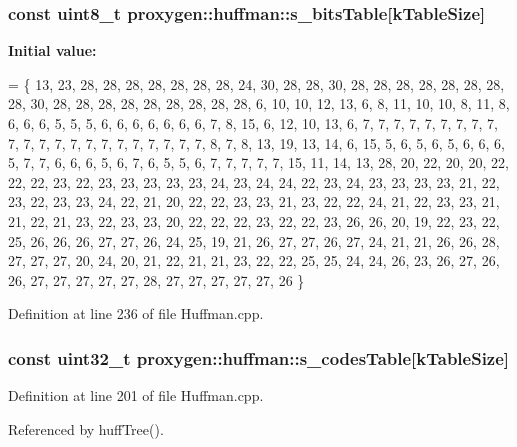 \subsubsection[{s\+\_\+bits\+Table}]{\setlength{\rightskip}{0pt plus 5cm}const uint8\+\_\+t proxygen\+::huffman\+::s\+\_\+bits\+Table[{\bf k\+Table\+Size}]}\label{namespaceproxygen_1_1huffman_a7d81eb2d7692ad485c915b193604701c}
{\bfseries Initial value\+:}
\begin{DoxyCode}
= \{
  13, 23, 28, 28, 28, 28, 28, 28, 28, 24, 30, 28, 28, 30, 28, 28, 28, 28, 28,
  28, 28, 28, 30, 28, 28, 28, 28, 28, 28, 28, 28, 28, 6, 10, 10, 12, 13, 6, 8,
  11, 10, 10, 8, 11, 8, 6, 6, 6, 5, 5, 5, 6, 6, 6, 6, 6, 6, 6, 7, 8, 15, 6,
  12, 10, 13, 6, 7, 7, 7, 7, 7, 7, 7, 7, 7, 7, 7, 7, 7, 7, 7, 7, 7, 7, 7, 7,
  7, 7, 8, 7, 8, 13, 19, 13, 14, 6, 15, 5, 6, 5, 6, 5, 6, 6, 6, 5, 7, 7, 6, 6,
  6, 5, 6, 7, 6, 5, 5, 6, 7, 7, 7, 7, 7, 15, 11, 14, 13, 28, 20, 22, 20, 20,
  22, 22, 22, 23, 22, 23, 23, 23, 23, 23, 24, 23, 24, 24, 22, 23, 24, 23, 23,
  23, 23, 21, 22, 23, 22, 23, 23, 24, 22, 21, 20, 22, 22, 23, 23, 21, 23, 22,
  22, 24, 21, 22, 23, 23, 21, 21, 22, 21, 23, 22, 23, 23, 20, 22, 22, 22, 23,
  22, 22, 23, 26, 26, 20, 19, 22, 23, 22, 25, 26, 26, 26, 27, 27, 26, 24, 25,
  19, 21, 26, 27, 27, 26, 27, 24, 21, 21, 26, 26, 28, 27, 27, 27, 20, 24, 20,
  21, 22, 21, 21, 23, 22, 22, 25, 25, 24, 24, 26, 23, 26, 27, 26, 26, 27, 27,
  27, 27, 27, 28, 27, 27, 27, 27, 27, 26
\}
\end{DoxyCode}


Definition at line 236 of file Huffman.\+cpp.

\subsubsection[{s\+\_\+codes\+Table}]{\setlength{\rightskip}{0pt plus 5cm}const uint32\+\_\+t proxygen\+::huffman\+::s\+\_\+codes\+Table[{\bf k\+Table\+Size}]}\label{namespaceproxygen_1_1huffman_a291c3a976d3fa1a16636fd9887fabf7d}


Definition at line 201 of file Huffman.\+cpp.



Referenced by huff\+Tree().

